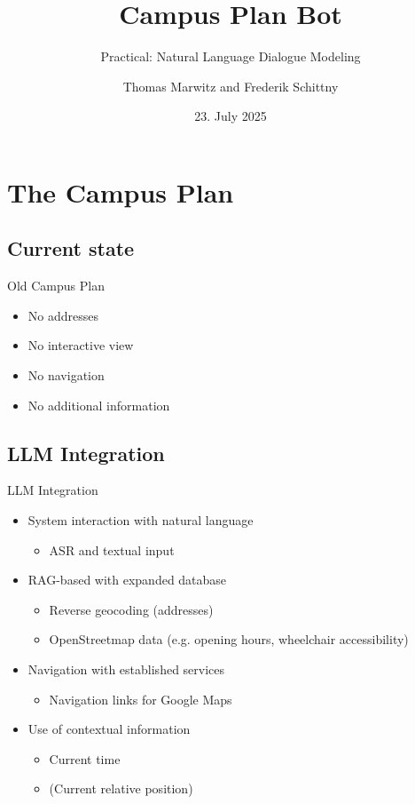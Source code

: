 \documentclass{sdqbeamer}[smallfoot]
\title[Campus Plan Bot]{Campus Plan Bot}
\subtitle{Practical: Natural Language Dialogue Modeling}
\author[Marwitz, Schittny]{Thomas Marwitz and Frederik Schittny}
\date[23.\,7.\,2025]{23. July 2025}
\begin{document}
\begin{frame}[title white horizontal, picture=images/campusplan_cover, kitlogo=black]
\titlepage
\end{frame}

\begin{frame}[tableofcontents=green]{}
    \tableofcontents
\end{frame}


\section{The Campus Plan}
\subsection{Current state}
\begin{frame}[picture 66 vertical,picture=images/old_campusplan,kitlogo=black]{Old Campus Plan}
    \begin{itemize}
        \item No addresses
        \item No interactive view
        \item No navigation
        \item No additional information
    \end{itemize}
\end{frame}

\subsection{LLM Integration}
\begin{frame}{LLM Integration}
    \begin{itemize}
        \item System interaction with natural language
            \begin{itemize}
                \item ASR and textual input
            \end{itemize}
        \item RAG-based with expanded database
            \begin{itemize}
                \item Reverse geocoding (addresses)
                \item OpenStreetmap data (e.g. opening hours, wheelchair accessibility)
            \end{itemize}
        \item Navigation with established services
            \begin{itemize}
                \item Navigation links for Google Maps
            \end{itemize}
        \item Use of contextual information
            \begin{itemize}
                \item Current time
                \item (Current relative position)
            \end{itemize}
    \end{itemize}
\end{frame}
\end{document}
